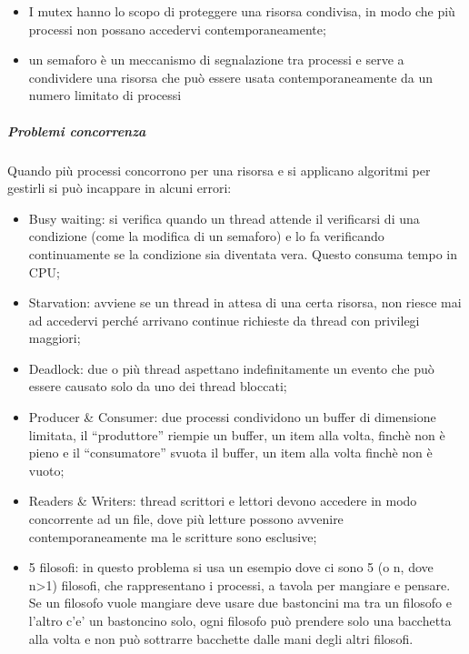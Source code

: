 \begin{itemize}
\item
  I mutex hanno lo scopo di proteggere una risorsa condivisa, in modo
  che più processi non possano accedervi contemporaneamente;
\item
  un semaforo è un meccanismo di segnalazione tra processi e serve a
  condividere una risorsa che può essere usata contemporaneamente da un
  numero limitato di processi
\end{itemize}

\subparagraph{\texorpdfstring{\emph{Problemi
concorrenza}}{Problemi concorrenza}}\label{problemi-concorrenza}

Quando più processi concorrono per una risorsa e si applicano algoritmi
per gestirli si può incappare in alcuni errori:

\begin{itemize}
\item
  Busy waiting: si verifica quando un thread attende il verificarsi di
  una condizione (come la modifica di un semaforo) e lo fa verificando
  continuamente se la condizione sia diventata vera. Questo consuma
  tempo in CPU;
\item
  Starvation: avviene se un thread in attesa di una certa risorsa, non
  riesce mai ad accedervi perché arrivano continue richieste da thread
  con privilegi maggiori;
\item
  Deadlock: due o più thread aspettano indefinitamente un evento che può
  essere causato solo da uno dei thread bloccati;
\item
  Producer \& Consumer: due processi condividono un buffer di dimensione
  limitata, il ``produttore'' riempie un buffer, un item alla volta,
  finchè non è pieno e il ``consumatore'' svuota il buffer, un item alla
  volta finchè non è vuoto;
\item
  Readers \& Writers: thread scrittori e lettori devono accedere in modo
  concorrente ad un file, dove più letture possono avvenire
  contemporaneamente ma le scritture sono esclusive;
\item
  5 filosofi: in questo problema si usa un esempio dove ci sono 5 (o n,
  dove n\textgreater1) filosofi, che rappresentano i processi, a tavola
  per mangiare e pensare. Se un filosofo vuole mangiare deve usare due
  bastoncini ma tra un filosofo e l'altro c'e' un bastoncino solo, ogni
  filosofo può prendere solo una bacchetta alla volta e non può
  sottrarre bacchette dalle mani degli altri filosofi.
\end{itemize}

